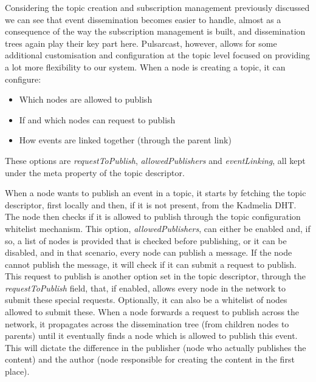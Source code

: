 Considering the topic creation and subscription management previously discussed
we can see that event dissemination becomes easier to handle, almost as a
consequence of the way the subscription management is built, and dissemination
trees again play their key part here. Pulsarcast, however, allows for some
additional customisation and configuration at the topic level focused on
providing a lot more flexibility to our system. When a node is creating a
topic, it can configure:
\begin{itemize}
  \item
    Which nodes are allowed to publish
  \item
     If and which nodes can request to publish
  \item
    How events are linked together (through the parent link)
\end{itemize}

These options are \emph{requestToPublish}, \emph{allowedPublishers} and
\emph{eventLinking}, all kept under the meta property of the topic descriptor.

When a node wants to publish an event in a topic, it starts by fetching the
topic descriptor, first locally and then, if it is not present, from the
Kadmelia DHT. The node then checks if it is allowed to publish through the
topic configuration whitelist mechanism. This option, \emph{allowedPublishers},
can either be enabled and, if so, a list of nodes is provided that is checked
before publishing, or it can be disabled, and in that scenario, every node can
publish a message. If the node cannot publish the message, it will check if it
can submit a request to publish. This request to publish is another option set
in the topic descriptor, through the \emph{requestToPublish} field, that, if
enabled, allows every node in the network to submit these special requests.
Optionally, it can also be a whitelist of nodes allowed to submit these. When a
node forwards a request to publish across the network, it propagates across the
dissemination tree (from children nodes to parents) until it eventually finds a
node which is allowed to publish this event. This will dictate the difference
in the publisher (node who actually publishes the content) and the author (node
responsible for creating the content in the first place).

